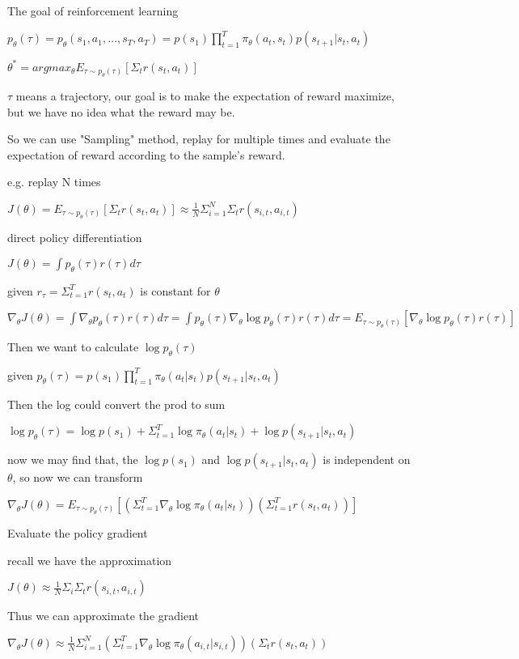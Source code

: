 The goal of reinforcement learning 

$p_{\theta}(\tau)=p_{\theta}(s_1,a_1,\dots, s_T,a_T)=p(s_1)\prod_{t=1}^T\pi_{\theta}(a_t,s_t)p(s_{t+1}|s_t,a_t)$

$\theta^{*}=argmax_{\theta}E_{\tau\sim p_\theta(\tau)}[\Sigma_t r(s_t, a_t)]$

$\tau$ means a trajectory, 
our goal is to make the expectation of reward maximize, 
but we have no idea what the reward may be. 

So we can use "Sampling" method, 
replay for multiple times and evaluate 
the expectation of reward according to the sample's reward.

e.g. replay N times

$J(\theta)=E_{\tau\sim p_{\theta}(\tau)}[\Sigma_t{r(s_t,a_t)}]\approx \frac{1}{N}\Sigma_{i=1}^N\Sigma_t r(s_{i,t},a_{i,t})$

direct policy differentiation

$J(\theta)=\int p_\theta(\tau)r(\tau)d\tau$

given $r_{\tau}=\Sigma_{t=1}^T r(s_t,a_t)$ is constant for $\theta$

$\nabla_{\theta}J(\theta)=\int\nabla_{\theta}p_{\theta}(\tau)r(\tau)d\tau=\int p_{\theta}(\tau)\nabla_{\theta}\log{p_{\theta}(\tau)}r(\tau)d\tau=E_{\tau\sim p_{\theta}(\tau)}[\nabla_{\theta}\log{p_\theta(\tau)r(\tau)}]$

Then we want to calculate $\log{p_\theta(\tau)}$

given $p_{\theta}(\tau)=p(s_1)\prod_{t=1}^T\pi_{\theta}(a_t|s_t)p(s_{t+1}|s_t,a_t)$

Then the log could convert the prod to sum

$\log{p_{\theta}(\tau)} = \log{p(s_1)}+\Sigma_{t=1}^T\log{\pi_\theta(a_t|s_t)+\log{p(s_{t+1}|s_t,a_t)}}$


now we may find that, the $\log{p(s_1)}$ and $\log{p(s_{t+1}|s_t,a_t)}$ is independent on $\theta$, so now we can transform 

$\nabla_{\theta}J(\theta)=E_{\tau\sim p_{\theta}(\tau)}[(\Sigma_{t=1}^T\nabla_{\theta} \log{\pi_{\theta}(a_t|s_t)})(\Sigma_{t=1}^T r(s_t,a_t))]$

Evaluate the policy gradient

recall we have the approximation 

$J(\theta)\approx \frac{1}{N}\Sigma_i\Sigma_t r(s_{i,t},a_{i,t})$

Thus we can approximate the gradient 

$\nabla_\theta J(\theta) \approx \frac{1}{N}\Sigma_{i=1}^N(\Sigma_{t=1}^T\nabla_\theta\log{\pi_{\theta}(a_{i,t}|s_{i,t})})(\Sigma_{t}r(s_t, a_t))$

